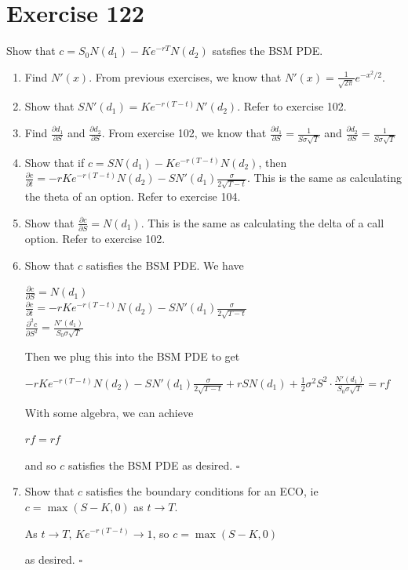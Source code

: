 \documentclass{article}
\begin{document}
\section*{Exercise 122}
Show that $c = S_0N(d_1) - Ke^{-rT}N(d_2)$ satsfies the BSM PDE.
\begin{flushleft}
    \begin{enumerate}
        \item Find $N'(x)$. From previous exercises, we know that $N'(x) = \frac{1}{\sqrt{2\pi}}e^{-x^2/2}$.
        \item Show that $SN'(d_1)=Ke^{-r(T-t)}N'(d_2)$. Refer to exercise 102.
        \item Find $\frac{\partial d_1}{\partial S}$ and $\frac{\partial d_2}{\partial S}$. From exercise 102, we know that $\frac{\partial d_1}{\partial S} = \frac{1}{S\sigma \sqrt{T}}$ and $\frac{\partial d_2}{\partial S} = \frac{1}{S\sigma \sqrt{T}}$
        \item Show that if $c=SN(d_1)-Ke^{-r(T-t)}N(d_2)$, then $\frac{\partial c}{\partial t}=-rKe^{-r(T-t)}N(d_2)-SN'(d_1)\frac{\sigma}{2\sqrt{T-t}}$. This is the same as calculating the theta of an option. Refer to exercise 104.
        \item Show that $\frac{\partial c}{\partial S} = N(d_1)$. This is the same as calculating the delta of a call option. Refer to exercise 102.
        \item Show that $c$ satisfies the BSM PDE. We have
            \begin{center}
                $\frac{\partial c}{\partial S} = N(d_1)$ \\
                $\frac{\partial c}{\partial t}=-rKe^{-r(T-t)}N(d_2)-SN'(d_1)\frac{\sigma}{2\sqrt{T-t}}$ \\
                $\frac{\partial^2 c}{\partial S^2} = \frac{N'(d_1)}{S_0\sigma \sqrt{T}}$
            \end{center}
            Then we plug this into the BSM PDE to get
            \begin{center}
                $-rKe^{-r(T-t)}N(d_2)-SN'(d_1)\frac{\sigma}{2\sqrt{T-t}} + rS N(d_1) + \frac{1}{2} \sigma^2 S^2 \cdot \frac{N'(d_1)}{S_0\sigma \sqrt{T}} = rf$
            \end{center}
            With some algebra, we can achieve
            \begin{center}
                $rf = rf$
            \end{center}
            and so $c$ satisfies the BSM PDE as desired. $\square$
        \item Show that $c$ satisfies the boundary conditions for an ECO, ie $c = \max(S-K, 0)$ as $t \rightarrow T$.
            \begin{center}
                As $t \rightarrow T$, $Ke^{-r(T-t)} \rightarrow 1$, so $c = \max(S-K, 0)$
            \end{center}
            as desired. $\square$
    \end{enumerate}
\end{flushleft}
\end{document}
